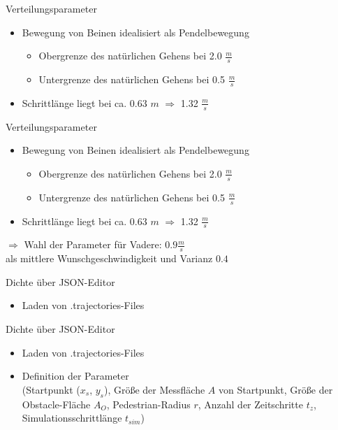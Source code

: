 \begin{frame}{Verteilungsparameter}
	\begin{itemize}
		\item Bewegung von Beinen idealisiert als Pendelbewegung \cite{weidmann-1993}
		\begin{itemize}
			\item Obergrenze des natürlichen Gehens bei 2.0 $\frac{m}{s}$ \cite{weidmann-1993}
			\item Untergrenze des natürlichen Gehens bei 0.5 $\frac{m}{s}$ \cite{weidmann-1993}
		\end{itemize}
		\item Schrittlänge liegt bei ca. 0.63 $m$ $\Rightarrow$ 1.32 $\frac{m}{s}$
	\end{itemize}
\end{frame}
\begin{frame}{Verteilungsparameter}
	\begin{itemize}
		\item Bewegung von Beinen idealisiert als Pendelbewegung \cite{weidmann-1993}
		\begin{itemize}
			\item Obergrenze des natürlichen Gehens bei 2.0 $\frac{m}{s}$ \cite{weidmann-1993}
			\item Untergrenze des natürlichen Gehens bei 0.5 $\frac{m}{s}$ \cite{weidmann-1993}
		\end{itemize}
		\item Schrittlänge liegt bei ca. 0.63 $m$ $\Rightarrow$ 1.32 $\frac{m}{s}$ \cite{weidmann-1993}
	\end{itemize}
	\vspace{1cm}
	\hspace{1cm}$\Rightarrow$ Wahl der Parameter für Vadere: $0.9 \frac{m}{s}$\\\hspace{1.5cm}als mittlere Wunschgeschwindigkeit und Varianz $0.4$
\end{frame}
\begin{frame}{Dichte über JSON-Editor}
	\begin{itemize}
		\item Laden von .trajectories-Files
	\end{itemize}
\end{frame}
\begin{frame}{Dichte über JSON-Editor}
	\begin{itemize}
		\item Laden von .trajectories-Files
		\item Definition der Parameter\\(Startpunkt ($x_s$, $y_s$), Größe der Messfläche $A$ von Startpunkt, Größe der Obstacle-Fläche $A_O$, Pedestrian-Radius $r$, Anzahl der Zeitschritte $t_z$, Simulationsschrittlänge $t_{sim}$)
	\end{itemize}
\end{frame}
